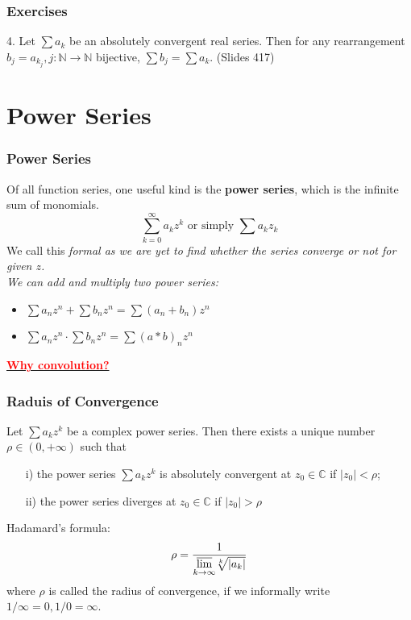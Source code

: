\documentclass{beamer}
\newcommand{\myfont}{\rmfamily\normalsize\upshape\mdseries}
\begin{document}
\begin{frame}
    \frametitle{Exercises}
    4. Let $\sum a_k$ be an absolutely convergent real series. Then for any rearrangement 
    $b_j=a_{k_j} , j:\mathbb{N}\to \mathbb{N} $ bijective, $\sum b_j=\sum a_k$. (Slides 417)

    

\end{frame}
\section{Power Series}
\begin{frame}
    \frametitle{Power Series}

   \hspace{1em} Of all function series, one useful kind is the \textbf{power series}, 
    which is the infinite sum of monomials.
    $$\sum_{k=0}^\infty a_k z^k \text{ or simply } \sum a_k z_k$$
    \hspace{1em} We call this \itshape formal \myfont as we are yet to find whether the series converge or
    not for given $z$.\\
    \vspace{1em}
    We can add and multiply two power series:
    \begin{itemize}
        \item $\sum a_n z^n +\sum b_n z^n = \sum (a_n+b_n) z^n$
        \item $\sum a_n z^n \cdot \sum b_n z^n = \sum (a*b)_n z^n$
    \end{itemize}
    \href{https://www.zhihu.com/question/54677157}{\textcolor{red}{\textbf{Why convolution?}}}
\end{frame}
\begin{frame}
    \frametitle{Raduis of Convergence}
    \hspace{1em} Let $\sum a_k z^k$ be a complex power series. 
    Then there exists a unique number $\rho \in (0, +\infty)$ such that 
    \begin{itemize}
        \item[i)] the power series $\sum a_k z^k$ is absolutely convergent at $z_0  \in \mathbb{C}$ if $|z_0 |<\rho$; 
        \item[ii)] the power series diverges at $z_0  \in \mathbb{C}$ if $|z_0 |>\rho$ 
    \end{itemize}
    \vspace{1em}
    Hadamard's formula:
$$\rho=\frac{1}{\underset{k\to \infty}{\varlimsup} \sqrt[k]{|a_k|}}$$
where $\rho$ is called the radius of convergence, if we informally write $1/\infty = 0, 1/0 = \infty$. 

\end{frame}
\end{document}
